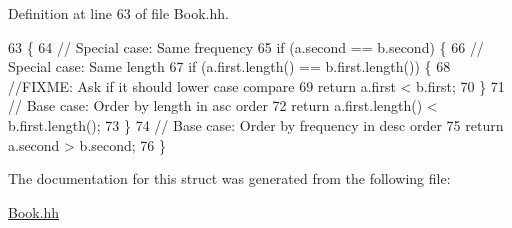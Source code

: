 Definition at line 63 of file Book.\-hh.


\begin{DoxyCode}
63                                                                                 \{
64             \textcolor{comment}{// Special case: Same frequency}
65             \textcolor{keywordflow}{if} (a.second == b.second) \{
66                 \textcolor{comment}{// Special case: Same length}
67                 \textcolor{keywordflow}{if} (a.first.length() == b.first.length()) \{
68                     \textcolor{comment}{//FIXME: Ask if it should lower case compare}
69                     \textcolor{keywordflow}{return} a.first < b.first;
70                 \}
71                 \textcolor{comment}{// Base case: Order by length in asc order}
72                 \textcolor{keywordflow}{return} a.first.length() < b.first.length();
73             \}
74             \textcolor{comment}{// Base case: Order by frequency in desc order}
75             \textcolor{keywordflow}{return} a.second > b.second;
76         \}
\end{DoxyCode}


The documentation for this struct was generated from the following file\-:\begin{DoxyCompactItemize}
\item 
\hyperlink{_book_8hh}{Book.\-hh}\end{DoxyCompactItemize}
